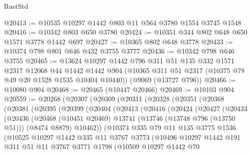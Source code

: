 \begin{lexlean}{RustStd}
\begin{coremodule}
{{@20413 := @10535 @10297 @1442 @803 @11 @564 @3780 @1554 @3745 @1548
@20416 := @10342 @803 @650 @3780
@20424 := @10351 @344 @802 @648 @650 @1571 @3778 @1442 @697
@20427 := @10365 @802 @648 @3778
@20433 := @10374 @798 @801 @646 @432 @3755 @3777
@20436 := @10342 @798 @646 @3755
@20465 := @13624
    @10297
    @1442
    @796
    @311
    @51
    @135
    @332
    @1571
    @2317
    @12068
    @44
    @1442
    @1442
    @904
    (@10365 @311 @51 @2317 (@10375 @78 @49 @20 @1528 @1535 @10404 @10440))
    (@9069 (@13727 @796))
@20466 := @10080 @904
@20468 := @20465 (@10447 @20466)
@20469 := @10103 @904
@20559 := @20268
    (@20307
      (@20309
        (@20311
          (@20328
            (@20351
              (@20368
                (@20381
                  (@20395
                    (@20399
                      (@20404
                        (@20413
                          (@20416
                            (@20424
                              (@20427
                                (@20433
                                  (@20436
                                    (@20468
                                      (@10451 @20469)
                                      @13741
                                      (@13746 (@13748 @796 (@13750 @51)))
                                      (@8474 @8879)
                                      @10462))
                                  (@10374
                                    @335
                                    @79
                                    @11
                                    @135
                                    @3775
                                    @1536
                                    (@10525
                                      @10297
                                      @1442
                                      @335
                                      @11
                                      @3767
                                      @3773
                                      (@10496
                                        @10297
                                        @1442
                                        @191
                                        @311
                                        @51
                                        @11
                                        @3767
                                        @3771
                                        @1798
                                        (@10509
                                          @10297
                                          @1442
                                          @70
}}
\end{coremodule}
\end{lexlean}
